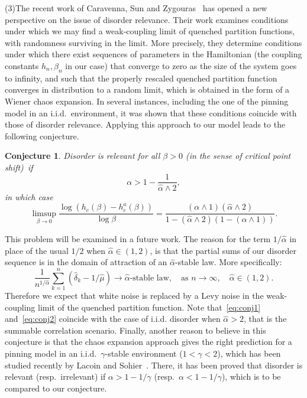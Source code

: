 \documentclass[11pt]{article}
\newtheorem{conj}[theo]{Conjecture}
\theoremstyle{definition}
\numberwithin{equation}{section}
\numberwithin{figure}{section}
\numberwithin{table}{section}
\newcommand{\ga}{\alpha}
\newcommand{\gb}{\beta}
\newcommand{\gd}{\delta}
\newcommand{\ha}{\hat\ga}
\newcommand{\hmu}{\hat \mu}
\begin{document}
\medskip
\noindent (3)\enskip The recent work of Caravenna, Sun and Zygouras~\cite{CSZ16+} has opened a new perspective on the issue of disorder relevance. Their work examines conditions under which we may find a weak-coupling limit of quenched partition functions, with randomness surviving in the limit. More precisely, they determine conditions under which there exist sequences of parameters in the Hamiltonian (the coupling constants $h_n, \gb_n$ in our case) that converge to zero as the size of the system goes to infinity, and such that the properly rescaled quenched partition function converges in distribution to a random limit, which is obtained in the form of a Wiener chaos expansion. In several instances, including the one of the pinning model in an i.i.d.~environment, it was shown that these conditions coincide with those of disorder relevance. Applying this approach to our model leads to the following conjecture.

\begin{conj}\label{ConjRelevance}
Disorder is relevant for all $\gb>0$ (in the sense of critical point shift)~if
\begin{equation}\label{eq:conj1}
\ga > 1 - \frac{1}{\ha \wedge 2},
\end{equation}
in which case
\begin{equation} \label{eq:conj2}
\limsup_{\gb \to 0} \frac{\log (h_c(\gb) - h_c^a(\gb))}{\log \gb} = \frac{(\ga\wedge 1)(\ha\wedge 2)}{1-(\ha\wedge 2)(1-(\ga\wedge 1))}.
\end{equation}
\end{conj}

This problem will be examined in a future work. The reason for the term $1/\ha$ in place of the usual $1/2$ when $\ha\in (1,2)$, is that the partial sums of our disorder sequence is in the domain of attraction of an $\ha$-stable law. More specifically:
\begin{equation}
\frac{1}{n^{1/\ha}} \sum_{k=1}^n (\hat \gd_k - 1/\hmu) \longrightarrow \ha\text{-stable law},\quad \text{as\ } n\to\infty,\quad \ha\in(1,2).
\end{equation}
Therefore we expect that white noise is replaced by a Levy noise in the weak-coupling limit of the quenched partition function. Note that~\eqref{eq:conj1} and~\eqref{eq:conj2} coincide with the case of i.i.d. disorder when $\ha>2$, that is the summable correlation scenario. Finally, another reason to believe in this conjecture is that the chaos expansion approach gives the right prediction for a pinning model in an i.i.d.~$\gamma$-stable environment ($1 < \gamma < 2$), which has been studied recently by Lacoin and Sohier~\cite{LS16+}. There, it has been proved that disorder is relevant (resp.~irrelevant) if $\ga > 1 - 1/\gamma$ (resp.~$\ga < 1 - 1/\gamma$), which is to be compared to our conjecture.
\end{document}
